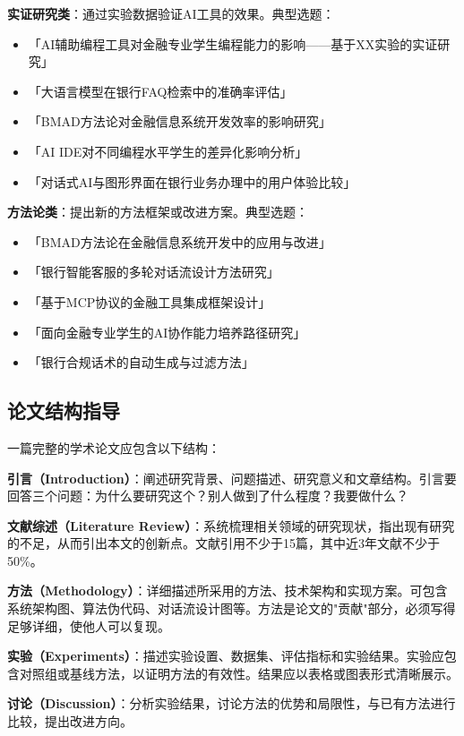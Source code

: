 \textbf{实证研究类}：通过实验数据验证AI工具的效果。典型选题：

\begin{itemize}[leftmargin=2em]
  \item 「AI辅助编程工具对金融专业学生编程能力的影响——基于XX实验的实证研究」
  \item 「大语言模型在银行FAQ检索中的准确率评估」
  \item 「BMAD方法论对金融信息系统开发效率的影响研究」
  \item 「AI IDE对不同编程水平学生的差异化影响分析」
  \item 「对话式AI与图形界面在银行业务办理中的用户体验比较」
\end{itemize}

\textbf{方法论类}：提出新的方法框架或改进方案。典型选题：

\begin{itemize}[leftmargin=2em]
  \item 「BMAD方法论在金融信息系统开发中的应用与改进」
  \item 「银行智能客服的多轮对话流设计方法研究」
  \item 「基于MCP协议的金融工具集成框架设计」
  \item 「面向金融专业学生的AI协作能力培养路径研究」
  \item 「银行合规话术的自动生成与过滤方法」
\end{itemize}

\subsection{论文结构指导}

一篇完整的学术论文应包含以下结构：

\textbf{引言（Introduction）}：阐述研究背景、问题描述、研究意义和文章结构。引言要回答三个问题：为什么要研究这个？别人做到了什么程度？我要做什么？

\textbf{文献综述（Literature Review）}：系统梳理相关领域的研究现状，指出现有研究的不足，从而引出本文的创新点。文献引用不少于15篇，其中近3年文献不少于50\%。

\textbf{方法（Methodology）}：详细描述所采用的方法、技术架构和实现方案。可包含系统架构图、算法伪代码、对话流设计图等。方法是论文的"贡献"部分，必须写得足够详细，使他人可以复现。

\textbf{实验（Experiments）}：描述实验设置、数据集、评估指标和实验结果。实验应包含对照组或基线方法，以证明方法的有效性。结果应以表格或图表形式清晰展示。

\textbf{讨论（Discussion）}：分析实验结果，讨论方法的优势和局限性，与已有方法进行比较，提出改进方向。

